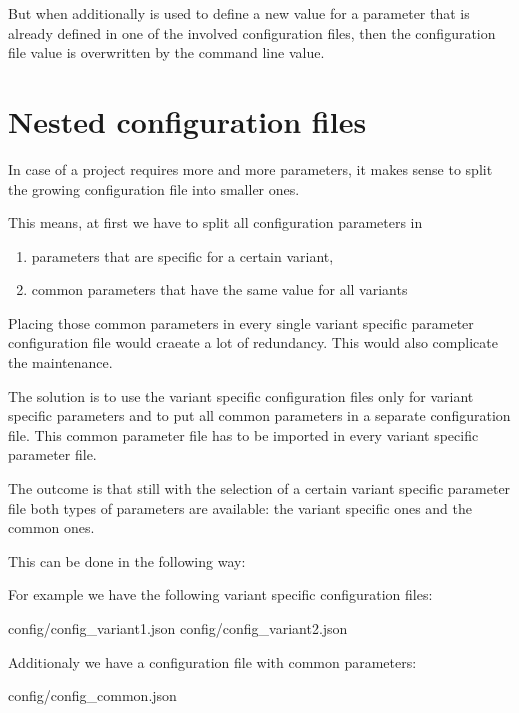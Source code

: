 But when additionally  is used to define a new value for a parameter that is already defined in one of the involved configuration files,
then the configuration file value is overwritten by the command line value.

\newpage

\section{Nested configuration files}

In case of a project requires more and more parameters, it makes sense to split the growing configuration file into smaller ones.

This means, at first we have to split all configuration parameters in
\begin{enumerate}
   \item parameters that are specific for a certain variant,
   \item common parameters that have the same value for all variants
\end{enumerate}

Placing those common parameters in every single variant specific parameter configuration file would craeate a lot of redundancy.
This would also complicate the maintenance.

The solution is to use the variant specific configuration files only for variant specific parameters and to put all common parameters in
a separate configuration file. This common parameter file has to be imported in every variant specific parameter file.

The outcome is that still with the selection of a certain variant specific parameter file both types of parameters are available:
the variant specific ones and the common ones.

This can be done in the following way:

For example we have the following variant specific configuration files:

\begin{pythonlog}
config/config_variant1.json
config/config_variant2.json
\end{pythonlog}

Additionaly we have a configuration file with common parameters:

\begin{pythonlog}
config/config_common.json
\end{pythonlog}

